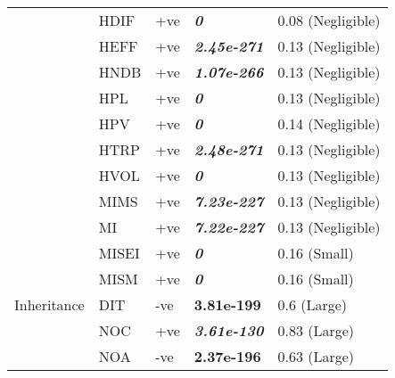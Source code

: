\begin{table}
\begin{adjustbox}{width=1.0\textwidth,center}
\begin{tabular}{lllll}
\\
         &  HDIF & +ve & \textit{\textbf{0}}  &  0.08 (Negligible)

\\
         &  \cellcolor{gray!30}HEFF & \cellcolor{gray!30}+ve &  \cellcolor{gray!30}\textit{\textbf{2.45e-271}} &  \cellcolor{gray!30}0.13 (Negligible)

\\
         &  HNDB & +ve &  \textit{\textbf{1.07e-266}} & 0.13  (Negligible)

\\
         &  \cellcolor{gray!30}HPL & \cellcolor{gray!30}+ve & \cellcolor{gray!30}\textit{\textbf{0}} & \cellcolor{gray!30}0.13  (Negligible)

\\
         &  HPV & +ve & \textit{\textbf{0}}  & 0.14  (Negligible)

\\
         &  \cellcolor{gray!30}HTRP & \cellcolor{gray!30}+ve &  \cellcolor{gray!30}\textit{\textbf{2.48e-271}} & \cellcolor{gray!30}0.13  (Negligible)

\\
         &  HVOL & +ve & \textit{\textbf{0}}  &  0.13  (Negligible)

\\
         &  \cellcolor{gray!30}MIMS & \cellcolor{gray!30}+ve & \cellcolor{gray!30}\textit{\textbf{7.23e-227}}  &  \cellcolor{gray!30}0.13  (Negligible)

\\
         &   MI & +ve &  \textit{\textbf{7.22e-227}} &  0.13  (Negligible)

\\
         &   \cellcolor{gray!30}MISEI & \cellcolor{gray!30}+ve & \cellcolor{gray!30}\textit{\textbf{0}} & \cellcolor{gray!30}0.16  (Small)

\\
         &   MISM &  +ve&  \textit{\textbf{0}}  & 0.16  (Small)

\\
Inheritance &   \cellcolor{gray!30}DIT & \cellcolor{gray!30}-ve & \cellcolor{gray!30}\textbf{3.81e-199} & \cellcolor{gray!30}0.6 (Large) 
 
\\
            &  NOC & +ve & \textbf{\textit{3.61e-130}} & 0.83 (Large)  

\\
            &  \cellcolor{gray!30}NOA & \cellcolor{gray!30}-ve & \cellcolor{gray!30}\textbf{2.37e-196}  & \cellcolor{gray!30}0.63 (Large)
 

\end{tabular}
\end{adjustbox}
\end{table}
